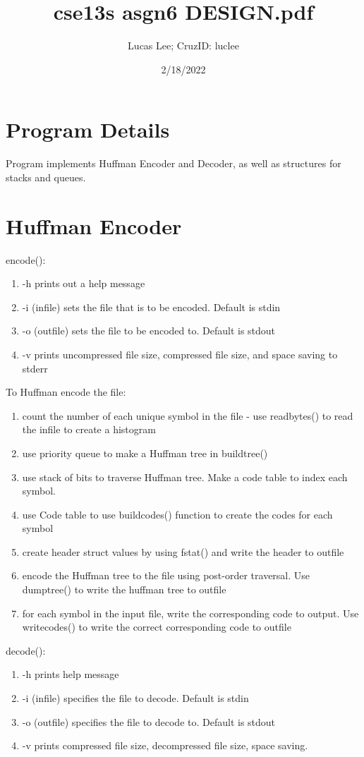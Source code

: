 \documentclass[11pt]{article}
\title{cse13s asgn6 DESIGN.pdf}
\author{Lucas Lee; CruzID: luclee}
\date{2/18/2022}
\begin{document}
\maketitle
\section{Program Details}\label{ss:details}
Program implements Huffman Encoder and Decoder, as well as structures for stacks and queues.
\section{Huffman Encoder}\label{ss:encoder}
encode():
\begin{enumerate}
\item -h prints out a help message
\item -i (infile) sets the file that is to be encoded. Default is stdin
\item -o (outfile) sets the file to be encoded to. Default is stdout
\item -v prints uncompressed file size, compressed file size, and space saving to stderr
\end{enumerate}
To Huffman encode the file:
\begin{enumerate}
	\item count the number of each unique symbol in the file - use readbytes() to read the infile to create a histogram
	\item use priority queue to make a Huffman tree in buildtree()
\item use stack of bits to traverse Huffman tree. Make a code table to index each symbol.
\item use Code table to use buildcodes() function to create the codes for each symbol
\item create header struct values by using fstat() and write the header to outfile
\item encode the Huffman tree to the file using post-order traversal. Use dumptree() to write the huffman tree to outfile
\item for each symbol in the input file, write the corresponding code to output. Use writecodes() to write the correct corresponding code to outfile
\end{enumerate}
decode():
\begin{enumerate}
\item -h prints help message
\item -i (infile) specifies the file to decode. Default is stdin
\item -o (outfile) specifies the file to decode to. Default is stdout
\item -v prints compressed file size, decompressed file size, space saving.
\end{enumerate}
\end{document}
